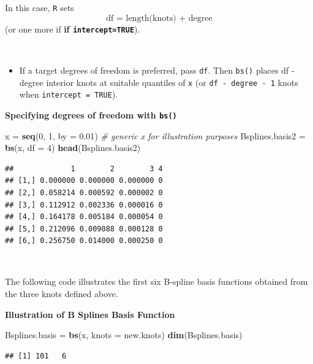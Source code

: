 \documentclass[
]{book}
\newenvironment{Shaded}{\begin{snugshade}}{\end{snugshade}}
\newcommand{\AttributeTok}[1]{\textcolor[rgb]{0.13,0.29,0.53}{#1}}
\newcommand{\CommentTok}[1]{\textcolor[rgb]{0.56,0.35,0.01}{\textit{#1}}}
\newcommand{\DecValTok}[1]{\textcolor[rgb]{0.00,0.00,0.81}{#1}}
\newcommand{\FloatTok}[1]{\textcolor[rgb]{0.00,0.00,0.81}{#1}}
\newcommand{\FunctionTok}[1]{\textcolor[rgb]{0.13,0.29,0.53}{\textbf{#1}}}
\newcommand{\NormalTok}[1]{#1}
\newcommand{\OtherTok}[1]{\textcolor[rgb]{0.56,0.35,0.01}{#1}}
\providecommand{\tightlist}{%
  \setlength{\itemsep}{0pt}\setlength{\parskip}{0pt}}
\begin{document}
In this case, \texttt{R} sets
\[\text{df = length(knots) + degree}\]
(or one more if \textbf{if \texttt{intercept=TRUE}}).

~

\begin{itemize}
\tightlist
\item
  If a target degrees of freedom is preferred, pass \texttt{df}. Then \texttt{bs()} places df - degree interior knots at suitable quantiles of \texttt{x} (or \texttt{df\ -\ degree\ -\ 1} knots when \texttt{intercept\ =\ TRUE}).
\end{itemize}

\textbf{Specifying degrees of freedom with \texttt{bs()}}
~

\begin{Shaded}
\begin{Highlighting}[]
\NormalTok{x }\OtherTok{=} \FunctionTok{seq}\NormalTok{(}\DecValTok{0}\NormalTok{, }\DecValTok{1}\NormalTok{, }\AttributeTok{by =} \FloatTok{0.01}\NormalTok{)  }\CommentTok{\# generic \textasciigrave{}x\textasciigrave{} for illustration purposes}
\NormalTok{Bsplines.basis2 }\OtherTok{=} \FunctionTok{bs}\NormalTok{(x, }\AttributeTok{df =} \DecValTok{4}\NormalTok{)}
\FunctionTok{head}\NormalTok{(Bsplines.basis2)}
\end{Highlighting}
\end{Shaded}

\begin{verbatim}
##             1        2        3 4
## [1,] 0.000000 0.000000 0.000000 0
## [2,] 0.058214 0.000592 0.000002 0
## [3,] 0.112912 0.002336 0.000016 0
## [4,] 0.164178 0.005184 0.000054 0
## [5,] 0.212096 0.009088 0.000128 0
## [6,] 0.256750 0.014000 0.000250 0
\end{verbatim}

~

The following code illustrates the first six B-spline basis functions obtained from the three knots defined above.

\textbf{Illustration of B Splines Basis Function}

\begin{Shaded}
\begin{Highlighting}[]
\NormalTok{Bsplines.basis }\OtherTok{=} \FunctionTok{bs}\NormalTok{(x, }\AttributeTok{knots =}\NormalTok{ new.knots)}
\FunctionTok{dim}\NormalTok{(Bsplines.basis)}
\end{Highlighting}
\end{Shaded}

\begin{verbatim}
## [1] 101   6
\end{verbatim}
\end{document}
